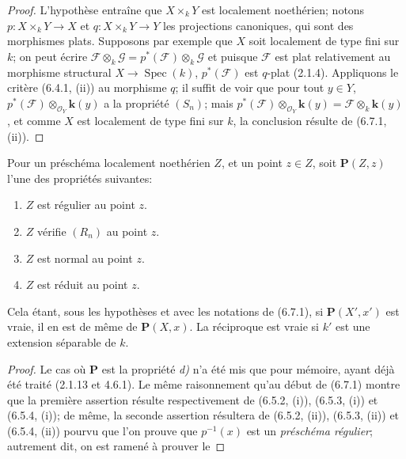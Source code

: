 \begin{proof}
L'hypothèse entraîne que $X\times_kY$ est localement noethérien; notons
$p:X\times_kY\to X$ et $q:X\times_kY\to Y$ les projections canoniques,
qui sont des morphismes plats. Supposons par exemple que $X$ soit
localement de type fini sur $k$; on peut écrire
$\mathscr F\otimes_k\mathscr G=p^*(\mathscr F)\otimes_k\mathscr G$
et puisque $\mathscr F$ est plat relativement au morphisme structural
$X\to\operatorname{Spec}(k)$, $p^*(\mathscr F)$ est $q$-plat (2.1.4).
Appliquons le critère (6.4.1, (ii)) au morphisme $q$; il suffit de voir
que pour tout $y\in Y$, $p^*(\mathscr F)\otimes_{\mathcal O_Y}\boldsymbol{k}(y)$
a la propriété $(S_n)$; mais
$p^*(\mathscr F)\otimes_{\mathcal O_Y}\boldsymbol{k}(y)=\mathscr F\otimes_k \boldsymbol{k}(y)$,
et comme $X$ est localement de type fini sur $k$, la conclusion résulte
de (6.7.1, (ii)).
\end{proof}

\begin{proposition}[6.7.4]
\label{IV.2.s6.7.4-fr}
Pour un préschéma localement noethérien $Z$, et un point $z\in Z$,
soit $\boldsymbol{P}(Z,z)$ l'une des propriétés suivantes:
\begin{enumerate}
\item[\textup{a)}] $Z$ est régulier au point $z$.
\item[\textup{b)}] $Z$ vérifie $(R_n)$ au point $z$.
\item[\textup{c)}] $Z$ est normal au point $z$.
\item[\textup{d)}] $Z$ est réduit au point $z$.
\end{enumerate}
Cela étant, sous les hypothèses et avec les notations de \textup{(6.7.1)}, si
$\boldsymbol{P}(X',x')$ est vraie, il en est de même de $\boldsymbol{P}(X,x)$. La réciproque est
vraie si $k'$ est une extension séparable de $k$.
\end{proposition}

\begin{proof}
Le cas où $\boldsymbol{P}$ est la propriété \emph{d)} n'a été mis que pour mémoire, ayant
déjà été traité (2.1.13 et 4.6.1). Le même raisonnement qu'au début
de (6.7.1) montre que la première assertion résulte
respectivement de (6.5.2, (i)), (6.5.3, (i)) et (6.5.4, (i)); de même,
la seconde assertion résultera de (6.5.2, (ii)), (6.5.3, (ii)) et
(6.5.4, (ii))
pourvu que l'on prouve que $p^{-1}(x)$ est un \emph{préschéma régulier}; autrement
dit, on est ramené à prouver le
\end{proof}


